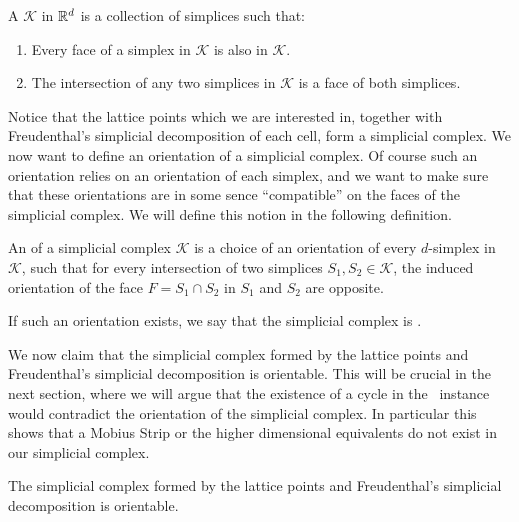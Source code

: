 \begin{definition}
    A  $\mathcal{K}$ in $\mathbb{R}^d$ is a collection of simplices such that:
    \begin{enumerate}
        \item Every face of a simplex in $\mathcal{K}$ is also in $\mathcal{K}$.
        \item The intersection of any two simplices in $\mathcal{K}$ is a face of both simplices.
    \end{enumerate}
\end{definition}

Notice that the lattice points which we are interested in, together with Freudenthal's simplicial decomposition of each cell, form a simplicial complex. We now want to define an orientation of a simplicial complex. Of course such an orientation relies on an orientation of each simplex, and we want to make sure that these orientations are in some sence ``compatible'' on the faces of the simplicial complex. We will define this notion in the following definition.

\begin{definition}
    An  of a simplicial complex $\mathcal{K}$ is a choice of an orientation of every $d$-simplex in $\mathcal{K}$, such that for every intersection of two simplices $S_1, S_2 \in \mathcal{K}$, the induced orientation of the face $F = S_1 \cap S_2$ in $S_1$ and $S_2$ are opposite. \par
    If such an orientation exists, we say that the simplicial complex is .
\end{definition}

We now claim that the simplicial complex formed by the lattice points and Freudenthal's simplicial decomposition is orientable. This will be crucial in the next section, where we will argue that the existence of a cycle in the \EndOfLine\ instance would contradict the orientation of the simplicial complex. In particular this shows that a Mobius Strip or the higher dimensional equivalents do not exist in our simplicial complex.

\begin{claim}
    The simplicial complex formed by the lattice points and Freudenthal's simplicial decomposition is orientable.
\end{claim}

